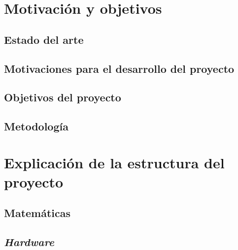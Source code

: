 
\chapter{Motivación y objetivos}

\section{Estado del arte}

\section{Motivaciones para el desarrollo del proyecto}

\section{Objetivos del proyecto}

\section{Metodología}


\chapter{Explicación de la estructura del proyecto}

\section{Matemáticas}

\section{\textit{Hardware}}

